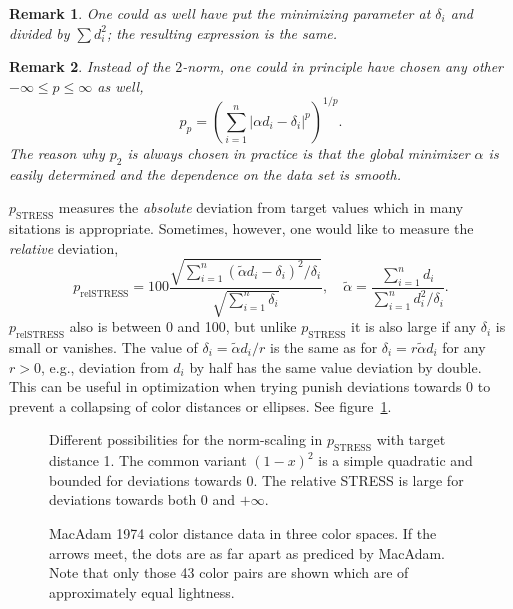 \documentclass{scrartcl}
\newtheorem*{remark}{Remark}
\theoremstyle{named}
\begin{document}
\begin{remark}
One could as well have put the minimizing parameter at $\delta_i$ and divided by $\sum
  d_i^2$; the resulting expression is the same.
\end{remark}

\begin{remark}
Instead of the $2$-norm, one could in principle have chosen any other $-\infty\le
  p\le\infty$ as well,
\[
p_p = \left(\sum_{i=1}^n |\alpha d_i - \delta_i|^p\right)^{1/p}.
\]
The reason why $p_2$ is always chosen in practice is that the global minimizer $\alpha$
  is easily determined and the dependence on the data set is smooth.
\end{remark}

$p_\text{STRESS}$ measures the \emph{absolute} deviation from target values which in
many sitations is appropriate. Sometimes, however, one would like to measure the
\emph{relative} deviation,
\[
  p_\text{relSTRESS} = 100 \frac{\sqrt{\sum_{i=1}^n (\tilde{\alpha} d_i -
  \delta_i)^2 / \delta_i}}{\sqrt{\sum_{i=1}^n \delta_i}}, \quad
  \tilde{\alpha} = \frac{\sum_{i=1}^n d_i}{\sum_{i=1}^n d_i^2 / \delta_i}.
\]
$p_\text{relSTRESS}$ also is between 0 and 100, but unlike $p_\text{STRESS}$ it
is also large if any $\delta_i$ is small or vanishes.
The value of $\delta_i=\tilde{\alpha} d_i / r$ is the same as for $\delta_i = r
\tilde{\alpha} d_i$ for any $r > 0$, e.g., deviation from $d_i$ by half has the same
value deviation by double.
This can be useful in optimization when trying punish deviations
towards 0 to prevent a collapsing of color distances or ellipses.
See figure~\ref{fig:norm-scaling}.

\begin{figure}
  \label{fig:norm-scaling}
  \centering
  
  \caption{Different possibilities for the norm-scaling in $p_\text{STRESS}$ with target
  distance 1. The common variant $(1-x)^2$ is a simple quadratic and bounded for
  deviations towards 0. The relative STRESS is large for deviations towards both 0 and
  $+\infty$.}
\end{figure}

\begin{figure}
  \centering
  
  \hfill
  
  \hfill
  
  \caption{MacAdam 1974 color distance data in three color spaces. If the arrows meet,
  the dots are as far apart as prediced by MacAdam. Note that only those 43 color pairs
  are shown which are of approximately equal lightness.}
\end{figure}
\end{document}
